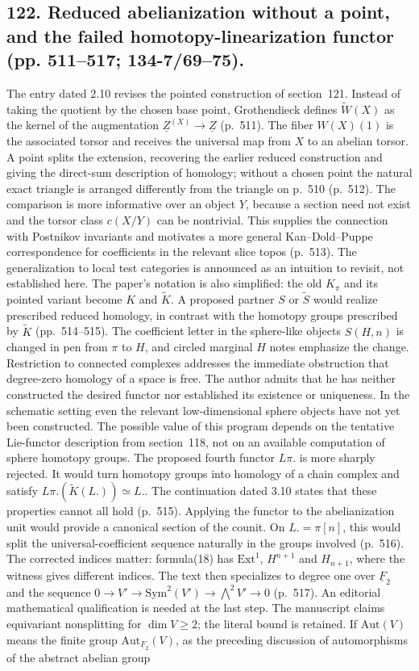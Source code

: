\documentclass[10pt,oneside]{book}
\begin{document}
\subsection*{122. Reduced abelianization without a point, and the failed homotopy-linearization functor (pp. 511--517; 134-7/69--75).}
The entry dated 2.10 revises the pointed construction of section~121. Instead of taking the quotient by the chosen base point, Grothendieck defines $\widetilde W(X)$ as the kernel of the augmentation $\underline Z^{(X)}\to\underline Z$ (p.~511). The fiber $W(X)(1)$ is the associated torsor and receives the universal map from $X$ to an abelian torsor. A point splits the extension, recovering the earlier reduced construction and giving the direct-sum description of homology; without a chosen point the natural exact triangle is arranged differently from the triangle on p.~510 (p.~512). The comparison is more informative over an object $Y$, because a section need not exist and the torsor class $c(X/Y)$ can be nontrivial. This supplies the connection with Postnikov invariants and motivates a more general Kan--Dold--Puppe correspondence for coefficients in the relevant slice topos (p.~513). The generalization to local test categories is announced as an intuition to revisit, not established here. The paper's notation is also simplified: the old $K_\pi$ and its pointed variant become $K$ and $\widetilde K$. A proposed partner $S$ or $\widetilde S$ would realize prescribed reduced homology, in contrast with the homotopy groups prescribed by $\widetilde K$ (pp.~514--515). The coefficient letter in the sphere-like objects $S(H,n)$ is changed in pen from $\pi$ to $H$, and circled marginal $H$ notes emphasize the change. Restriction to connected complexes addresses the immediate obstruction that degree-zero homology of a space is free. The author admits that he has neither constructed the desired functor nor established its existence or uniqueness. In the schematic setting even the relevant low-dimensional sphere objects have not yet been constructed. The possible value of this program depends on the tentative Lie-functor description from section~118, not on an available computation of sphere homotopy groups. The proposed fourth functor $L\pi.$ is more sharply rejected. It would turn homotopy groups into homology of a chain complex and satisfy $L\pi.(\widetilde K(L.))\simeq L.$. The continuation dated 3.10 states that these properties cannot all hold (p.~515). Applying the functor to the abelianization unit would provide a canonical section of the counit. On $L.=\pi[n]$, this would split the universal-coefficient sequence naturally in the groups involved (p.~516). The corrected indices matter: formula(18) has $\mathrm{Ext}^1$, $H^{n+1}$ and $H_{n+1}$, where the witness gives different indices. The text then specializes to degree one over $\underline F_2$ and the sequence $0\to V'\to\mathrm{Sym}^2(V')\to\bigwedge^2V'\to0$ (p.~517). An editorial mathematical qualification is needed at the last step. The manuscript claims equivariant nonsplitting for $\dim V\geq2$; the literal bound is retained. If $\mathrm{Aut}(V)$ means the finite group $\mathrm{Aut}_{\underline F_2}(V)$, as the preceding discussion of automorphisms of the abstract abelian group 
\end{document}

